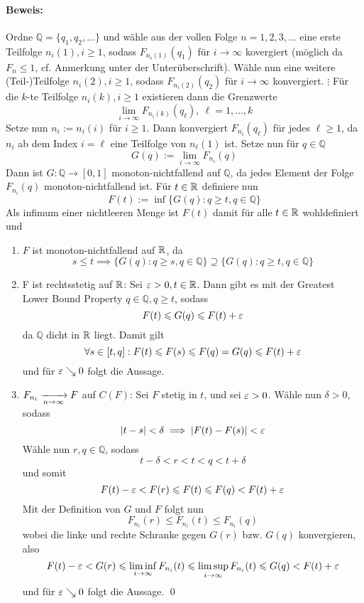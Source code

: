 \documentclass[11pt]{report}
\begin{document}
\paragraph{Beweis:}Ordne $\mathbb{Q}=\{q_1,q_2,\hdots\}$ und w\"ahle aus der vollen Folge $n=1,2,3,\hdots$ eine erste Teilfolge $n_i(1),i\geq1$, sodass $F_{n_i(1)}(q_1)$ f\"ur $i\to\infty$ kovergiert (m\"oglich da $F_n\leq1$, cf. Anmerkung unter der Unter\"uberschrift). \newline
W\"ahle nun eine weitere (Teil-)Teilfolge $n_i(2),i\geq1$, sodass $F_{n_i(2)}(q_2)$ f\"ur $i\to\infty$ konvergiert. \newline
$\vdots$\newline
F\"ur die $k$-te Teilfolge $n_i(k),i\geq1$ existieren dann die Grenzwerte 
$$\lim_{i\to\infty}F_{n_i(k)}(q_\ell), \  \ell=1,\hdots,k$$
Setze nun $n_i:=n_i(i)$ f\"ur $i\geq1$. Dann konvergiert $F_{n_i}(q_\ell)$ f\"ur jedes $\ell\geq1$, da $n_i$ ab dem Index $i=\ell$ eine Teilfolge von $n_\ell(1)$ ist.
Setze nun f\"ur $q\in\mathbb{Q}$
$$G(q):=\lim_{i\to\infty}F_{n_i}(q)$$
Dann ist $G:\mathbb{Q}\to[0,1]$ monoton-nichtfallend auf $\mathbb{Q}$, da jedes Element der Folge $F_{n_i}(q)$ monoton-nichtfallend ist. F\"ur $t\in\mathbb{R}$ definiere nun
$$F(t):=\inf\{G(q):q\geq t,q\in\mathbb{Q}\}$$ 
Als infimum einer nichtleeren Menge ist $F(t)$ damit f\"ur alle $t\in\mathbb{R}$ wohldefiniert und 
\begin{enumerate}
    \item $F$ ist monoton-nichtfallend auf $\mathbb{R}$, da
    $$s\leq t\implies\{G(q):q\geq s,q\in\mathbb{Q}\}\supseteq\{G(q):q\geq t,q\in\mathbb{Q}\}$$
    \item F ist rechtsstetig auf $\mathbb{R}$:\newline
    Sei $\varepsilon>0,t\in\mathbb{R}$. Dann gibt es mit der Greatest Lower Bound Property $q\in\mathbb{Q},q\geq t$, sodass
    $$F(t)\leqslant G(q)\leqslant F(t)+\varepsilon$$
    da $\mathbb{Q}$ dicht in $\mathbb{R}$ liegt. Damit gilt 
    $$\forall s\in[t,q]:F(t)\leqslant F(s)\leqslant F(q)=G(q)\leqslant F(t)+\varepsilon$$
    und f\"ur $\varepsilon\searrow0$ folgt die Aussage.
    \item $F_{n_i}\nto{}{n\to\infty} F$ auf $C(F)$:\newline
    Sei $F$ stetig in $t$, und sei $\varepsilon>0$. W\"ahle nun $\delta>0$, sodass
    $$|t-s|<\delta\implies|F(t)-F(s)|<\varepsilon$$
    W\"ahle nun $r,q\in\mathbb{Q}$, sodass
    $$t-\delta<r<t<q<t+\delta$$
    und somit 
    $$F(t)-\varepsilon<F(r)\leqslant F(t)\leqslant F(q)<F(t)+\varepsilon$$
    Mit der Definition von $G$ und $F$ folgt nun 
    $$F_{n_i}(r)\leq F_{n_i}(t)\leq F_{n_i}(q)$$
    wobei die linke und rechte Schranke gegen $G(r)$ bzw. $G(q)$ konvergieren, also
    $$F(t)-\varepsilon<G(r)\leqslant\liminf_{i\to\infty}F_{n_i}(t)\leqslant\limsup_{i\to\infty}F_{n_i}(t)\leqslant G(q)<F(t)+\varepsilon$$
    und f\"ur $\varepsilon\searrow0$ folgt die Aussage. \qed
\end{enumerate}
\end{document}
